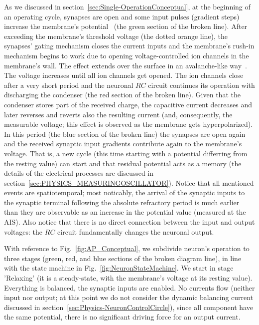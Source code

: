 As we discussed in section~\ref{sec:Single-OperationConceptual},
at the beginning of an operating cycle, synapses are open and some input pulses (gradient steps)
increase the membrane's potential~\cite{TransientResponses:2008,KochElectricalPropertiesSpike:1983} (the green section of the broken line).
After exceeding the membrane's threshold voltage (the dotted orange line), the synapses' gating mechanism closes the current inputs and
the membrane's rush-in mechanism begins to work due to opening voltage-controlled ion channels
in the membrane's wall. The effect extends over the surface in an
avalanche-like way~\cite{NeuronalAvalanches:2003}. The voltage increases
until all ion channels get opened. The ion channels close after a very short 
period and the neuronal $RC$ circuit continues its operation with discharging the condenser (the red section of the broken line). Given that the condenser stores part of the received charge,
the capacitive current decreases and later reverses and reverts also the resulting current (and, consequently, the measurable voltage; this effect is observed as the membrane gets hyperpolarized). 
In this period (the blue section of the broken line) the
synapses are open again and the received synaptic input gradients
contribute again to the membrane's voltage. That is, a new cycle 
(this time starting with a potential differring from the resting value)
can start and that residual potential acts as a memory
(the details of the electrical processes are discussed in section~\ref{sec:PHYSICS_MEASURINGOSCILLATOR}).
Notice that all mentioned events are spatiotemporal; most noticably,
the arrival of the synaptic inputs to the synaptic terminal
following the absolute refractory period is much earlier than
they are observable as an increase in the potential value (measured at
the 
AIS).
Also notice that there is no direct connection between the
input and output voltages: the $RC$ circuit fundamentally
changes the neuronal output. 

With reference to Fig.~\ref{fig:AP_Conceptual}, we subdivide neuron's operation
to three stages (green, red, and blue sections of the broken diagram line), in line with the state machine in Fig.~\ref{fig:NeuronStateMachine}.
We start in stage 'Relaxing' (it is a steady-state,
with the membrane's voltage at its resting value). Everything is balanced,
the synaptic inputs are enabled.
No currents flow (neither input nor output; at this point we do not consider the dynamic balancing current discussed in section~\ref{sec:Physics-NeuronControlCircle}), since all component have the same potential, there is no significant driving force for an output current.

